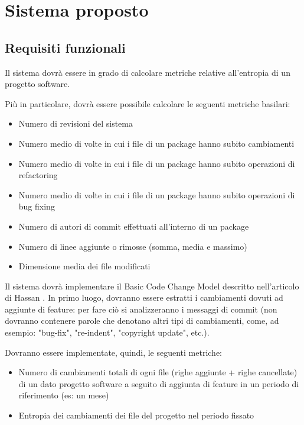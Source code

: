 \chapter{Sistema proposto}
\section{Requisiti funzionali}\label{req_fun}
Il sistema dovrà essere in grado di calcolare metriche relative all'entropia di un progetto software.

Più in particolare, dovrà essere possibile calcolare le seguenti metriche basilari:
\begin{itemize}
\item Numero di revisioni del sistema
\item Numero medio di volte in cui i file di un package hanno subito
cambiamenti
\item Numero medio di volte in cui i file di un package hanno subito operazioni
di refactoring
\item Numero medio di volte in cui i file di un package hanno subito operazioni di
bug fixing
\item Numero di autori di commit effettuati all’interno di un package
\item Numero di linee aggiunte o rimosse (somma, media e massimo)
\item Dimensione media dei file modificati
\end{itemize}

Il sistema dovrà implementare il Basic Code Change Model descritto nell'articolo di Hassan \cite{hassan2009predicting}.
In primo luogo, dovranno essere estratti i cambiamenti dovuti ad aggiunte di feature: per fare ciò si analizzeranno i messaggi di commit (non dovranno contenere parole che denotano altri tipi di cambiamenti, come, ad esempio: "bug-fix", "re-indent", "copyright update", etc.).

Dovranno essere implementate, quindi, le seguenti metriche:
\begin{itemize}
\item Numero di cambiamenti totali di ogni file (righe aggiunte + righe cancellate) di un dato progetto software a seguito di aggiunta di feature in un periodo di riferimento (es: un mese)
\item Entropia dei cambiamenti dei file del progetto nel periodo fissato
\end{itemize}

